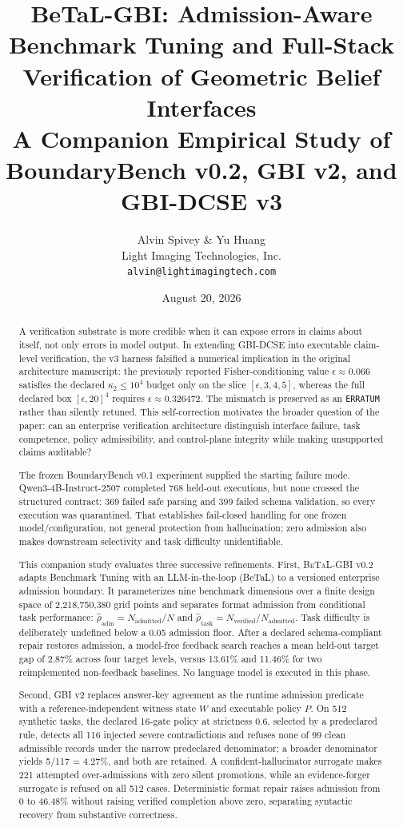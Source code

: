 \documentclass[11pt]{article}
\title{\textbf{BeTaL-GBI: Admission-Aware Benchmark Tuning and Full-Stack Verification of Geometric Belief Interfaces}\\[0.35em]
\large A Companion Empirical Study of BoundaryBench v0.2, GBI v2, and GBI-DCSE v3}
\author{Alvin Spivey \& Yu Huang\\Light Imaging Technologies, Inc.\\\texttt{alvin@lightimagingtech.com}}
\date{August 20, 2026}
\newcommand{\BeTaL}{\textsc{BeTaL}}
\newcommand{\rhatadm}{\widehat{\rho}_{\mathrm{adm}}}
\newcommand{\rhattask}{\widehat{\rho}_{\mathrm{task}}}
\begin{document}
\maketitle

\begin{abstract}
A verification substrate is more credible when it can expose errors in claims about itself, not only errors in model output. In extending GBI-DCSE into executable claim-level verification, the v3 harness falsified a numerical implication in the original architecture manuscript: the previously reported Fisher-conditioning value \(\epsilon\approx0.066\) satisfies the declared \(\kappa_2\le10^4\) budget only on the slice \([\epsilon,3,4,5]\), whereas the full declared box \([\epsilon,20]^4\) requires \(\epsilon\approx0.326472\). The mismatch is preserved as an \texttt{ERRATUM} rather than silently retuned. This self-correction motivates the broader question of the paper: can an enterprise verification architecture distinguish interface failure, task competence, policy admissibility, and control-plane integrity while making unsupported claims auditable?

The frozen BoundaryBench v0.1 experiment supplied the starting failure mode. Qwen3-4B-Instruct-2507 completed 768 held-out executions, but none crossed the structured contract: 369 failed safe parsing and 399 failed schema validation, so every execution was quarantined. That establishes fail-closed handling for one frozen model/configuration, not general protection from hallucination; zero admission also makes downstream selectivity and task difficulty unidentifiable.

This companion study evaluates three successive refinements. First, \BeTaL-GBI v0.2 adapts Benchmark Tuning with an LLM-in-the-loop (BeTaL) to a versioned enterprise admission boundary. It parameterizes nine benchmark dimensions over a finite design space of 2,218,750,380 grid points and separates format admission from conditional task performance: \(\rhatadm=N_{\mathrm{admitted}}/N\) and \(\rhattask=N_{\mathrm{verified}}/N_{\mathrm{admitted}}\). Task difficulty is deliberately undefined below a 0.05 admission floor. After a declared schema-compliant repair restores admission, a model-free feedback search reaches a mean held-out target gap of 2.87\% across four target levels, versus 13.61\% and 11.46\% for two reimplemented non-feedback baselines. No language model is executed in this phase.

Second, GBI v2 replaces answer-key agreement as the runtime admission predicate with a reference-independent witness state \(W\) and executable policy \(P\). On 512 synthetic tasks, the declared 16-gate policy at strictness 0.6, selected by a predeclared rule, detects all 116 injected severe contradictions and refuses none of 99 clean admissible records under the narrow predeclared denominator; a broader denominator yields 5/117 = 4.27\%, and both are retained. A confident-hallucinator surrogate makes 221 attempted over-admissions with zero silent promotions, while an evidence-forger surrogate is refused on all 512 cases. Deterministic format repair raises admission from 0 to 46.48\% without raising verified completion above zero, separating syntactic recovery from substantive correctness.


\end{abstract}
\end{document}
